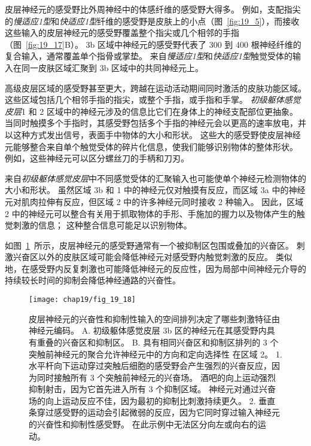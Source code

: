 皮层神经元的感受野比外周神经中的体感纤维的感受野大得多。
例如，支配指尖的\textit{慢适应1型}和\textit{快适应1型}纤维的感受野是皮肤上的小点（图~\ref{fig:19_5}），而接收这些输入的皮层神经元的感受野覆盖整个指尖或几个相邻的手指（图~\ref{fig:19_17}B）。
3b 区域中神经元的感受野代表了 300 到 400 根神经纤维的复合输入，通常覆盖单个指骨或掌垫。
来自\textit{慢适应1型}和\textit{快适应1型}触觉受体的输入在同一皮肤区域汇聚到 3b 区域中的共同神经元上。


高级皮层区域的感受野甚至更大，跨越在运动活动期间同时激活的皮肤功能区域。
这些区域包括几个相邻手指的指尖，或整个手指，或手指和手掌。
\textit{初级躯体感觉皮层}1  和 2 区域中的神经元涉及的信息比它们在身体上的神经支配部位更抽象。
当同时触摸多个手指时，其感受野包括多个手指的神经元会以更高的速率放电，并以这种方式发出信号，表面手中物体的大小和形状。
这些大的感受野使皮层神经元能够整合来自单个触觉受体的碎片化信息，使我们能够识别物体的整体形状。
例如，这些神经元可以区分螺丝刀的手柄和刀刃。


来自\textit{初级躯体感觉皮层}中不同感觉受体的汇聚输入也可能使单个神经元检测物体的大小和形状。
虽然区域 3b 和 1 中的神经元仅对触摸有反应，而区域 3a 中的神经元对肌肉拉伸有反应，但区域 2 中的许多神经元同时接收 2 种输入。
因此，区域 2 中的神经元可以整合有关用于抓取物体的手形、手施加的握力以及物体产生的触觉刺激的信息；
这种整合信息可能足以识别物体。


如图~\ref{fig:19_18}~所示，皮层神经元的感受野通常有一个被抑制区包围或叠加的兴奋区。
刺激兴奋区以外的皮肤区域可能会降低神经元对感受野内触觉刺激的反应。
类似地，在感受野内反复刺激也可能降低神经元的反应性，因为局部中间神经元介导的持续较长时间的抑制会降低神经通路的兴奋性。


\begin{figure}[htbp]
	\centering
	\texttt{[image: chap19/fig\_19\_18]}
	\caption{皮层神经元的兴奋性和抑制性输入的空间排列决定了哪些刺激特征由神经元编码。
		A. 初级躯体感觉皮层 3b 区的神经元在其感受野内具有重叠的兴奋区和抑制区\cite{dicarlo1998structure,sripati2006spatiotemporal}。
		B. 具有相同兴奋区和抑制区排列的 3 个突触前神经元的聚合允许神经元中的方向和定向选择性 在区域 2。
		1. 水平杆向下运动穿过突触后细胞的感受野会产生强烈的兴奋反应，因为同时接触所有 3 个突触前神经元的兴奋场。
		酒吧的向上运动强烈抑制射击，因为它首先进入所有 3 个抑制区域。
		神经元对通过兴奋场的向上运动反应不佳，因为最初的抑制比刺激持续更久。
		2. 垂直条穿过感受野的运动会引起微弱的反应，因为它同时穿过输入神经元的兴奋性和抑制性感受野。
		在此示例中无法区分向左或向右的运动。}
	\label{fig:19_18}
\end{figure}



